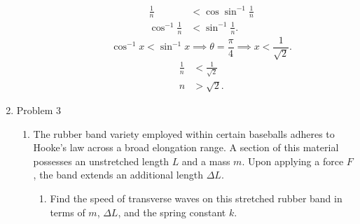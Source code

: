 \documentclass{article}
\begin{document}
\begin{enumerate}
\begin{enumerate}
\begin{enumerate}
\begin{align}
              \frac{1}{n} &< \cos\sin^{-1}\frac{1}{n} \\
              \cos^{-1}\frac{1}{n} &< \sin^{-1}\frac{1}{n}
            .\end{align}
            \begin{equation}
              \cos ^{-1}x < \sin ^{-1}x \implies \theta=\frac{\pi}{4} \implies x<\frac{1}{\sqrt{2}}
            .\end{equation}
            \begin{align}
              \frac{1}{n} &< \frac{1}{\sqrt{2}} \\
              n &> \sqrt{2}
            .\end{align}
        \end{enumerate}

    \end{enumerate}

    \newpage

  \item Problem 3
    \begin{enumerate}
      \item The rubber band variety employed within certain baseballs
        adheres to Hooke's law across a broad elongation range. A section
        of this material possesses an unstretched length $L$ and a mass $m$.
        Upon applying a force $F$, the band extends an additional length $\Delta L$.
        \begin{enumerate}
          \item Find the speed of transverse waves on this stretched rubber
            band in terms of $m$, $\Delta L$, and the spring constant $k$.


\end{enumerate}
\end{enumerate}
\end{enumerate}
\end{document}
